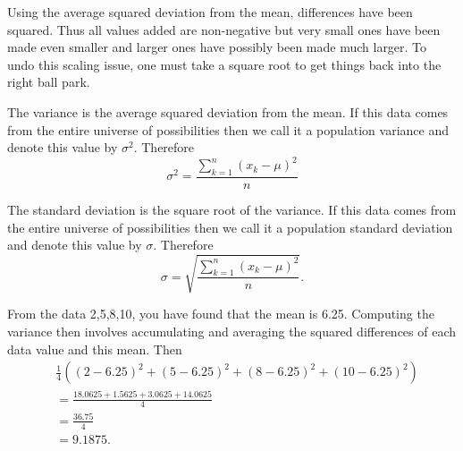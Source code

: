 \documentclass[10pt,]{book}
\theoremstyle{plain}
\theoremstyle{definition}
\theoremstyle{definition}
\theoremstyle{definition}
\numberwithin{equation}{section}
\begin{document}
Using the average squared deviation from the mean, differences have been squared. Thus all values added are non-negative but very small ones have been made even smaller and larger ones have possibly been made much larger. To undo this scaling issue, one must take a square root to get things back into the right ball park. 
%
\par
The variance is the average squared deviation from the mean. If this data comes from the entire universe of possibilities then we call it a population variance and denote this value by \(\sigma^2\). Therefore
	\begin{equation*}\sigma^2 = \frac{\sum_{k=1}^n ( x_k-\mu )^2}{n} \end{equation*}
%
\par
The standard deviation is the square root of the variance. If this data comes from the entire universe of possibilities then we call it a population standard deviation and denote this value by \(\sigma\). Therefore
\begin{equation*} \sigma = \sqrt{\frac{\sum_{k=1}^n ( x_k-\mu )^2}{n}}.\end{equation*}
%
\par
From the data {2,5,8,10}, you have found that the mean is 6.25. Computing the variance then involves accumulating and averaging the squared differences of each data value and this mean. Then
\begin{align*}
& \frac{1}{4} \left ( (2-6.25)^2 + (5-6.25)^2 + (8-6.25)^2 + (10-6.25)^2 \right ) \\
& = \frac{18.0625 + 1.5625 + 3.0625 + 14.0625}{4} \\
& = \frac{36.75}{4}\\
& = 9.1875.
\end{align*}
%
\par
\end{document}
